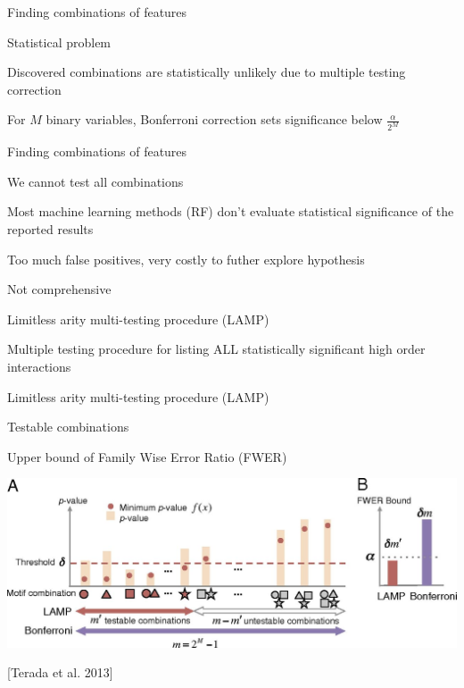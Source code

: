 \documentclass[ignorenonframetext,]{beamer}
\begin{document}
\begin{frame}{Finding combinations of features}

\begin{block}{Statistical problem}

Discovered combinations are statistically unlikely due to multiple
testing correction

For \(M\) binary variables, Bonferroni correction sets significance
below \(\frac{\alpha}{2^M}\)

\end{block}

\end{frame}

\begin{frame}{Finding combinations of features}

\begin{block}{We cannot test all combinations}

Most machine learning methods (RF) don't evaluate statistical
significance of the reported results

Too much false positives, very costly to futher explore hypothesis

Not comprehensive

\end{block}

\end{frame}

\begin{frame}{Limitless arity multi-testing procedure (LAMP)}

Multiple testing procedure for listing ALL statistically significant
high order interactions

\end{frame}

\begin{frame}{Limitless arity multi-testing procedure (LAMP)}

\begin{block}{Testable combinations}

Upper bound of Family Wise Error Ratio (FWER)

\includegraphics{images/F2.large.jpg}

{[}Terada et al. 2013{]}

\end{block}

\end{frame}
\end{document}
